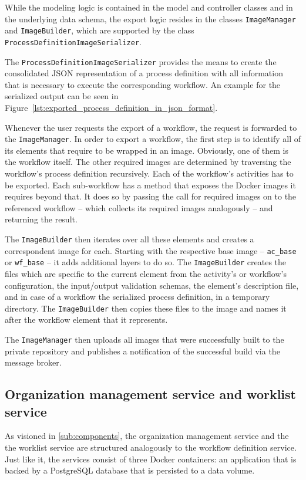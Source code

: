     While the modeling logic is contained in the model and controller classes and in the underlying data schema, the export logic resides in the classes \texttt{ImageManager} and \texttt{ImageBuilder}, which are supported by the class \texttt{ProcessDefinitionImageSerializer}.

    The \texttt{ProcessDefinitionImageSerializer} provides the means to create the consolidated JSON representation of a process definition with all information that is necessary to execute the corresponding workflow. An example for the serialized output can be seen in Figure~\ref{lst:exported_process_definition_in_json_format}.

    Whenever the user requests the export of a workflow, the request is forwarded to the \texttt{ImageManager}.
    In order to export a workflow, the first step is to identify all of its elements that require to be wrapped in an image. Obviously, one of them is the workflow itself. The other required images are determined by traversing the workflow's process definition recursively. Each of the workflow's activities has to be exported. Each sub-workflow has a method that exposes the Docker images it requires beyond that. It does so by passing the call for required images on to the referenced workflow -- which collects its required images analogously -- and returning the result.

    The \texttt{ImageBuilder} then iterates over all these elements and creates a correspondent image for each. Starting with the respective base image -- \texttt{ac\_base} or \texttt{wf\_base} -- it adds additional layers to do so. The \texttt{ImageBuilder} creates the files which are specific to the current element from the activity's or workflow's configuration, \ie the input/output validation  schemas, the element's description file, and in case of a workflow the serialized process definition, in a temporary directory. The \texttt{ImageBuilder} then copies these files to the image and names it after the workflow element that it represents.

    The \texttt{ImageManager} then uploads all images that were successfully built to the private repository and publishes a notification of the successful build via the message broker.

  \subsection{Organization management service and worklist service} %
    \label{sub:organization_management_service}
      As visioned in \ref{sub:components}, the organization management service and the the worklist service are structured analogously to the workflow definition service. Just like it, the services consist of three Docker containers: an application that is backed by a PostgreSQL database that is persisted to a data volume.

